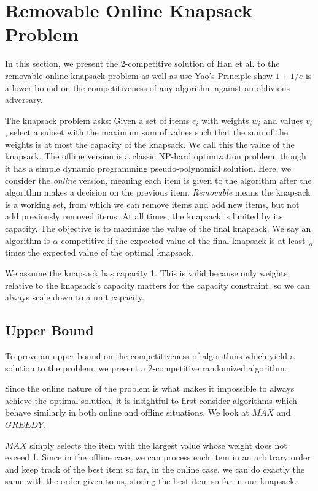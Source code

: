 \section{Removable Online Knapsack Problem}
In this section, we present the 2-competitive solution of Han et al. \cite{han} to the removable online knapsack problem as well as use Yao's Principle show $1+1/e$ is a lower bound on the competitiveness of any algorithm against an oblivious adversary.

The knapsack problem asks: Given a set of items $e_i$ with weights $w_i$ and values $v_i$, select a subset with the maximum sum of values such that the sum of the weights is at most the capacity of the knapsack. We call this the value of the knapsack. The offline version is a classic NP-hard optimization problem, though it has a simple dynamic programming pseudo-polynomial solution. Here, we consider the \emph{online} version, meaning each item is given to the algorithm after the algorithm makes a decision on the previous item. \emph{Removable} means the knapsack is a working set, from which we can remove items and add new items, but not add previously removed items. At all times, the knapsack is limited by its capacity. The objective is to maximize the value of the final knapsack. We say an algorithm is $\alpha$-competitive if the expected value of the final knapsack is at least $\frac{1}{\alpha}$ times the expected value of the optimal knapsack.

We assume the knapsack has capacity 1. This is valid because only weights relative to the knapsack's capacity matters for the capacity constraint, so we can always scale down to a unit capacity.

\subsection{Upper Bound} %
To prove an upper bound on the competitiveness of algorithms which yield a solution to the problem, we present a 2-competitive randomized algorithm.

Since the online nature of the problem is what makes it impossible to always achieve the optimal solution, it is insightful to first consider algorithms which behave similarly in both online and offline situations. We look at $MAX$ and $GREEDY$.

$MAX$ simply selects the item with the largest value whose weight does not exceed 1. Since in the offline case, we can process each item in an arbitrary order and keep track of the best item so far, in the online case, we can do exactly the same with the order given to us, storing the best item so far in our knapsack.

